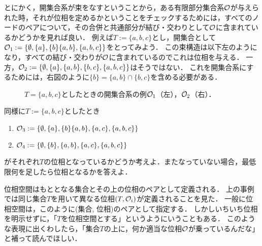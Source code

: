 \documentclass[11pt,a4paper]{jsarticle}
\begin{document}
とにかく，開集合系が束をなすということから，ある有限部分集合系$\mathcal{O}$が与えられた時，それが位相を定めるかということをチェックするためには，すべてのノードのペアについて，その合併と共通部分が結び・交わりとして$\mathcal{O}$に含まれているかどうかを見れば良い．
例えば$T:=\{a, b, c\}$とし，開集合として$\mathcal{O}_1 := \{ \emptyset, \{a \}, \{b\} \{a,b\}, \{a,b,c\} \}$をとってみよう．
この束構造は以下左のようになり，すべての結び・交わりが$\mathcal{O}$に含まれているのでこれは位相を与える．
一方，$\mathcal{O}_2 := \{ \emptyset, \{a \}, \{a,b\}, \{b,c\}, \{a,b,c\} \}$はそうではない．
これを開集合系にするためには，右図のように$\{b\} =  \{a,b\} \cap \{b,c\}$を含める必要がある．
\begin{figure}[h]
    \centering
    \caption{$T = \{a, b, c\}$としたときの開集合系の例$\mathcal{O}_1$（左），$\mathcal{O}_2$（右）．}
    \label{fig:3bool} 
\end{figure}


\begin{exercise}
\label{topologyex}
同様に$T:=\{a, b, c\}$としたとき
\begin{enumerate}
\item $\mathcal{O}_3 := \{ \emptyset, \{a \}, \{b\} \{a,b\}, \{a, c\}, \{a,b,c\} \}$
\item $\mathcal{O}_4 := \{ \emptyset, \{b\}, \{a,b\}, \{a, c\}, \{a,b,c\} \}$
\end{enumerate}
がそれぞれ$T$の位相となっているかどうか考えよ．またなっていない場合，最低限何を足したら位相となるかを答えよ．
\end{exercise}

位相空間はもととなる集合とその上の位相のペアとして定義される．
上の事例では同じ集合$T$を用いて異なる位相$(T, \mathcal{O}_i)$が定義されることを見た．
一般に位相空間は，このように(集合, 位相)のペアとして指定する．
しかしいちいち位相を明示せずに，「$T$を位相空間とする」というようにいうこともある．
このような表現に出くわしたら，「集合$T$の上に，何か適当な位相$\mathcal{O}$が乗っているんだな」と補って読んでほしい．
\end{document}
